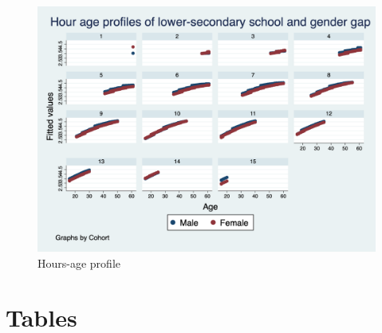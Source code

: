\documentclass[14pt]{sistedes}
\begin{document}
\begin{figure}
    \centering
    \includegraphics[scale=0.3]{graph5.png}
    \caption{Hours-age profile}
    \label{fig:h_cohorts}
\end{figure}
\section{Tables}
\begin{center}
    
    
    
    
    
    
    
\end{center}
\end{document}
